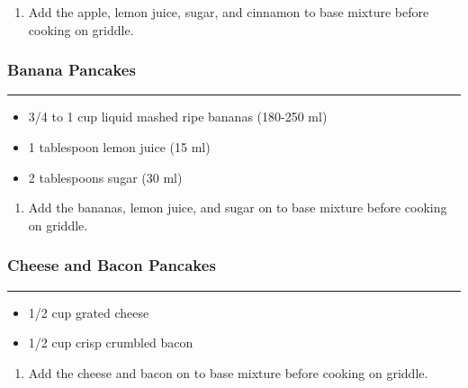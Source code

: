 \documentclass{article}
\begin{document}
\begin{enumerate}
    \item 
        Add the apple, lemon juice, sugar, and cinnamon to base mixture before cooking on griddle.
\end{enumerate}

\subsubsection{Banana Pancakes} 
\noindent\rule[0.5ex]{\linewidth}{0.5pt}

\begin{framed}
\begin{itemize}
    \item 3/4 to 1 cup liquid mashed ripe bananas (180-250 ml)
    \item 1 tablespoon lemon juice (15 ml) 
    \item 2 tablespoons sugar (30 ml)
\end{itemize}
\end{framed}

\begin{enumerate}
    \item 
        Add the bananas, lemon juice, and sugar on to base mixture before cooking on griddle.
\end{enumerate}

\subsubsection{Cheese and Bacon Pancakes} 
\noindent\rule[0.5ex]{\linewidth}{0.5pt}

\begin{framed}
\begin{itemize}
    \item 1/2 cup grated cheese 
    \item 1/2 cup crisp crumbled bacon
\end{itemize}
\end{framed}

\begin{enumerate}
    \item 
        Add the cheese and bacon on to base mixture before cooking on griddle.
\end{enumerate}

\end{document}
